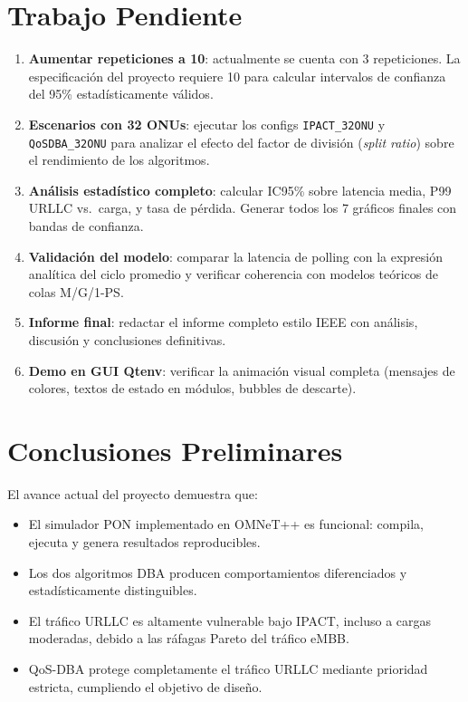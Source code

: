 \documentclass[12pt, letterpaper]{article}
\begin{document}
\section{Trabajo Pendiente}

\begin{enumerate}[leftmargin=1.5em]
  \item \textbf{Aumentar repeticiones a 10}: actualmente se cuenta con 3 repeticiones. La especificación del proyecto requiere 10 para calcular intervalos de confianza del 95\% estadísticamente válidos.

  \item \textbf{Escenarios con 32 ONUs}: ejecutar los configs \texttt{IPACT\_32ONU} y \texttt{QoSDBA\_32ONU} para analizar el efecto del factor de división (\textit{split ratio}) sobre el rendimiento de los algoritmos.

  \item \textbf{Análisis estadístico completo}: calcular IC95\% sobre latencia media, P99 URLLC vs.\ carga, y tasa de pérdida. Generar todos los 7 gráficos finales con bandas de confianza.

  \item \textbf{Validación del modelo}: comparar la latencia de polling con la expresión analítica del ciclo promedio y verificar coherencia con modelos teóricos de colas M/G/1-PS.

  \item \textbf{Informe final}: redactar el informe completo estilo IEEE con análisis, discusión y conclusiones definitivas.

  \item \textbf{Demo en GUI Qtenv}: verificar la animación visual completa (mensajes de colores, textos de estado en módulos, bubbles de descarte).
\end{enumerate}

\section{Conclusiones Preliminares}

El avance actual del proyecto demuestra que:

\begin{itemize}[leftmargin=1.5em]
  \item El simulador PON implementado en OMNeT++ es funcional: compila, ejecuta y genera resultados reproducibles.
  \item Los dos algoritmos DBA producen comportamientos diferenciados y estadísticamente distinguibles.
  \item El tráfico URLLC es altamente vulnerable bajo IPACT, incluso a cargas moderadas, debido a las ráfagas Pareto del tráfico eMBB.
  \item QoS-DBA protege completamente el tráfico URLLC mediante prioridad estricta, cumpliendo el objetivo de diseño.
\end{itemize}
\end{document}
